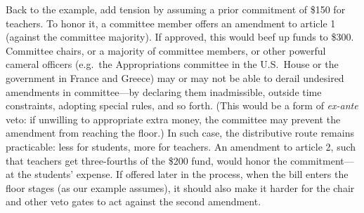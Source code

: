 \documentclass[letter,12pt]{article}
\begin{document}
Back to the example, add tension by assuming a prior commitment of \$150 for teachers. To honor it, a committee member offers an amendment to article 1 (against the committee majority). If approved, this would beef up funds to \$300. Committee chairs, or a majority of committee members, or other powerful cameral officers (e.g.\ the Appropriations committee in the U.S.\ House or the government in France and Greece) may or may not be able to derail undesired amendments in committee---by declaring them inadmissible, outside time constraints, adopting special rules, and so forth. (This would be a form of \emph{ex-ante} veto: if unwilling to appropriate extra money, the committee may prevent the amendment from reaching the floor.) In such case, the distributive route remains practicable: less for students, more for teachers. An amendment to article 2, such that teachers get three-fourths of the \$200 fund, would honor the commitment---at the students' expense. If offered later in the process, when the bill enters the floor stages (as our example assumes), it should also make it harder for the chair and other veto gates to act against the second amendment. 
\end{document}
